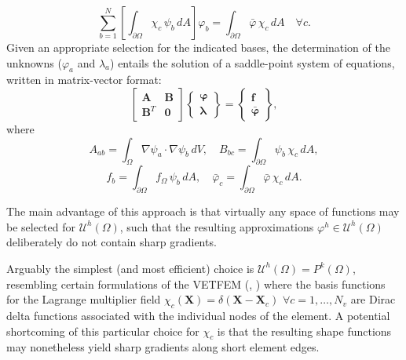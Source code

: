 \begin{equation}
	\sum_{b=1}^N \left[ \int_{\partial \Omega} \chi_c \, \psi_b \, dA \right] \varphi_b = \int_{\partial \Omega} \bar{\varphi} \, \chi_c \, dA \quad \forall c.
\end{equation}
Given an appropriate selection for the indicated bases, the determination of the unknowns ($\varphi_a$ and $\lambda_a$) entails the solution of a saddle-point system of equations, written in matrix-vector format:
\begin{equation}
	\left[ \begin{array}{cc} \mathbf{A} & \mathbf{B} \\ \mathbf{B}^T & \mathbf{0} \end{array} \right] \left\{ \begin{array}{c} \boldsymbol{\varphi} \\ \boldsymbol{\lambda} \end{array} \right\} = \left\{ \begin{array}{c} \mathbf{f} \\ \bar{\boldsymbol{\varphi}} \end{array} \right\},
\end{equation}
where
\begin{equation}
	A_{ab} = \int_{\Omega} \nabla \psi_a \cdot \nabla \psi_b \, dV, \quad B_{bc} = \int_{\partial \Omega} \psi_b \, \chi_c \, dA,
\end{equation}
\begin{equation}
	f_{b} = \int_{\partial \Omega} f_\Omega \, \psi_b \, dA, \quad \bar{\varphi}_{c} = \int_{\partial \Omega} \bar{\varphi} \, \chi_c \, dA.
\end{equation}

	The main advantage of this approach is that virtually any space of functions may be selected for $\mathcal{U}^h (\Omega)$, such that the resulting approximations $\varphi^h \in \mathcal{U}^h (\Omega)$ deliberately do not contain sharp gradients.
	
	Arguably the simplest (and most efficient) choice is $\mathcal{U}^h (\Omega) = P^{k} (\Omega)$, resembling certain formulations of the VETFEM (\cite{Rashid:00}, \cite{Rashid:06}) where the basis functions for the Lagrange multiplier field $\chi_c (\mathbf{X}) = \delta (\mathbf{X} - \mathbf{X}_c) \, \, \forall c = 1, \ldots, N_v$ are Dirac delta functions associated with the individual nodes of the element. A potential shortcoming of this particular choice for $\chi_c$ is that the resulting shape functions may nonetheless yield sharp gradients along short element edges.
	
